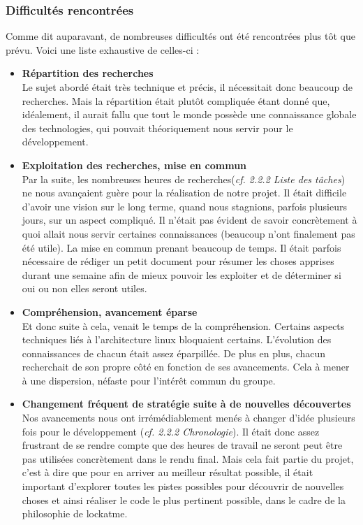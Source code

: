 \documentclass[french]{report}
\begin{document}
\subsubsection{Difficultés rencontrées}
Comme dit auparavant, de nombreuses difficultés ont été rencontrées plus tôt que prévu.
Voici une liste exhaustive de celles-ci :

\vspace{0.5cm}
\begin{itemize}[label=\textbullet, font=\normalfont \color{blue}]
  \item{\textbf{Répartition des recherches}}\\
Le sujet abordé était très technique et précis, il nécessitait donc beaucoup de
recherches. Mais la répartition était plutôt compliquée étant donné que, idéalement,
il aurait fallu que tout le monde possède une connaissance globale des technologies,
qui pouvait théoriquement nous servir pour le développement.\\

  \item{\textbf{Exploitation des recherches, mise en commun}}\\
Par la suite, les nombreuses heures de recherches(\emph{cf. 2.2.2 Liste des tâches}) ne nous avançaient guère pour la
réalisation de notre projet. Il était difficile d'avoir une vision sur le long
terme, quand nous stagnions, parfois plusieurs jours, sur un aspect compliqué. Il
n'était pas évident de savoir concrètement à quoi allait nous servir certaines
connaissances (beaucoup n'ont finalement pas été utile). La mise
en commun prenant beaucoup de temps. Il était parfois nécessaire de rédiger un
petit document pour résumer les choses apprises durant une semaine afin de mieux
pouvoir les exploiter et de déterminer si oui ou non elles seront utiles.\\

  \item{\textbf{Compréhension, avancement éparse}}\\
Et donc suite à cela, venait le temps de la compréhension. Certains aspects techniques
liés à l'architecture linux bloquaient certains. L'évolution des connaissances de
chacun était assez éparpillée. De plus en plus, chacun recherchait de son propre
côté en fonction de ses avancements. Cela à mener à une dispersion, néfaste pour
l'intérêt commun du groupe.\\

  \item{\textbf{Changement fréquent de stratégie suite à de nouvelles découvertes}}\\
Nos avancements nous ont irrémédiablement menés à changer d'idée plusieurs fois
pour le développement (\emph{cf. 2.2.2 Chronologie}). Il était donc assez
frustrant de se rendre compte que des heures de travail ne seront peut être pas
utilisées concrètement dans le rendu final. Mais cela fait partie du projet,
c'est à dire que pour en arriver au meilleur résultat possible, il était important
d'explorer toutes les pistes possibles pour découvrir de nouvelles choses et ainsi
réaliser le code le plus pertinent possible, dans le cadre de la philosophie de lockatme.\\


\end{itemize}
\end{document}
